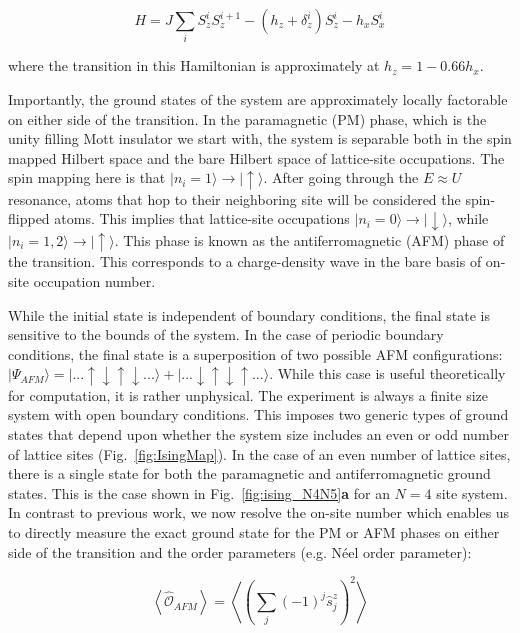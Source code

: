 \begin{equation}
\label{eqn:isingHam}
H=J \sum_i S^i_z S^{i+1}_z - (h_z + \delta^i_z)S^i_z - h_x S^i_x
\end{equation}

where the transition in this Hamiltonian is approximately at $h_z = 1 - 0.66 h_x$.

Importantly, the ground states of the system are approximately locally factorable on either side of the transition. In the paramagnetic (PM) phase, which is the unity filling Mott insulator we start with, the system is separable both in the spin mapped Hilbert space and the bare Hilbert space of lattice-site occupations. The spin mapping here is that $|n_i=1 \rangle \rightarrow | \uparrow \rangle $.  After going through the $E\approx U$ resonance, atoms that hop to their neighboring site will be considered the spin-flipped atoms. This implies that lattice-site occupations $|n_i= 0 \rangle \rightarrow | \downarrow \rangle $, while $| n_i = 1,2 \rangle \rightarrow | \uparrow \rangle$. This phase is known as the antiferromagnetic (AFM) phase of the transition. This corresponds to a charge-density wave in the bare basis of on-site occupation number.

While the initial state is independent of boundary conditions, the final state is sensitive to the bounds of the system. In the case of periodic boundary conditions, the final state is a superposition of two possible AFM configurations: $|\Psi_{AFM}\rangle = | ... \uparrow \downarrow \uparrow \downarrow ... \rangle + | ... \downarrow \uparrow \downarrow \uparrow ... \rangle $. While this case is useful theoretically for computation, it is rather unphysical. The experiment is always a finite size system with open boundary conditions. This imposes two generic types of ground states that depend upon whether the system size includes an even or odd number of lattice sites (Fig.~\ref{fig:IsingMap}). In the case of an even number of lattice sites, there is a single state for both the paramagnetic and antiferromagnetic ground states. This is the case shown in Fig.~\ref{fig:ising_N4N5}\textbf{a} for an $N=4$ site system. In contrast to previous work\cite{Simon2011}, we now resolve the on-site number which enables us to directly measure the exact ground state for the PM or AFM phases on either side of the transition and the order parameters (e.g. N\'eel order parameter): 

\begin{equation}
\label{eqn:Neel}
\left \langle \hat{\mathcal{O}}_{AFM} \right \rangle = \left \langle \left (  \sum_j (-1)^j \hat{s}_j^z \right )^2  \right \rangle
\end{equation}

